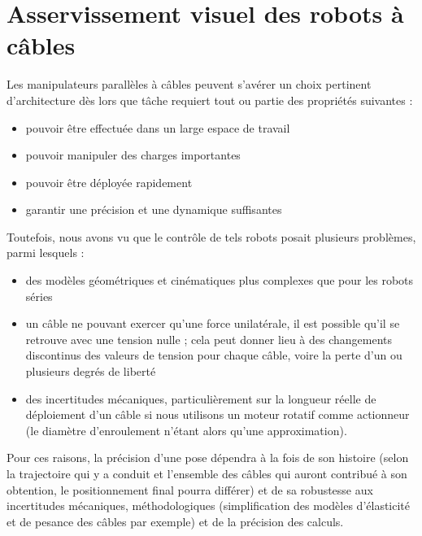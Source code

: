 \chapter{Asservissement visuel des robots à c\^ables}

Les manipulateurs parallèles à câbles peuvent s'avérer un choix pertinent d'architecture dès lors que tâche requiert tout ou partie des propriétés suivantes :
\begin{itemize}
 \item pouvoir être effectuée dans un large espace de travail
 \item pouvoir manipuler des charges importantes
 \item pouvoir être déployée rapidement
 \item garantir une précision et une dynamique suffisantes
\end{itemize}

Toutefois, nous avons vu que le contrôle de tels robots posait plusieurs problèmes, parmi lesquels :
\begin{itemize}
 \item des modèles géométriques et cinématiques plus complexes que pour les robots séries
 \item un câble ne pouvant exercer qu'une force unilatérale, il est possible qu'il se retrouve avec une tension nulle ; cela peut donner lieu à des changements discontinus des valeurs de tension pour chaque c\^able, voire la perte d'un ou plusieurs degrés de liberté
 \item des incertitudes mécaniques, particulièrement sur la longueur réelle de déploiement d'un c\^able si nous utilisons un moteur rotatif comme actionneur (le diamètre d'enroulement n'étant alors qu'une approximation).
\end{itemize}

Pour ces raisons, la précision d'une pose dépendra à la fois de son histoire (selon la trajectoire qui y a conduit et l'ensemble des câbles qui auront contribué à son obtention, le positionnement final pourra différer) et de sa robustesse aux incertitudes mécaniques, méthodologiques (simplification des modèles d'élasticité et de pesance des câbles par exemple) et de la précision des calculs.

